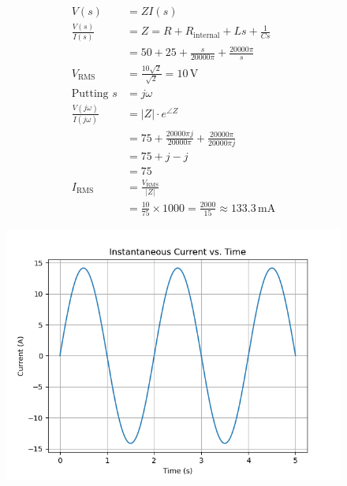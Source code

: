 \documentclass[journal,12pt,onecolumn]{IEEEtran}
\begin{document}
\begin{align}
    V(s) &= Z I(s) \\
    \frac{V(s)}{I(s)} &= Z = R + R_{\text{internal}} + Ls + \frac{1}{Cs} \\
    &= 50 + 25 + \frac{s}{20000\pi} + \frac{20000\pi}{s} \\
    V_{\text{RMS}} &= \frac{10\sqrt{2}}{\sqrt{2}} = 10 \, \text{V} \\
    \text{Putting } s &= j\omega \\
    \frac{V(j\omega)}{I(j\omega)} &= |Z| \cdot e^{\angle Z} \\
    &= 75 + \frac{20000 \pi j}{20000 \pi} + \frac{20000\pi }{20000 \pi j} \\
    &= 75 + j - j \\
    &=75 \\
    I_{\text{RMS}} &= \frac{V_{\text{RMS}}}{|Z|}  \\
    &= \frac{10}{75} \times 1000 = \frac{2000}{15} \approx 133.3 \, \text{mA}
\end{align}
\begin{figure}[ht!]
    \centering
    \includegraphics[width=\columnwidth]{figs/gate1.png}    
\end{figure}
\end{document}
